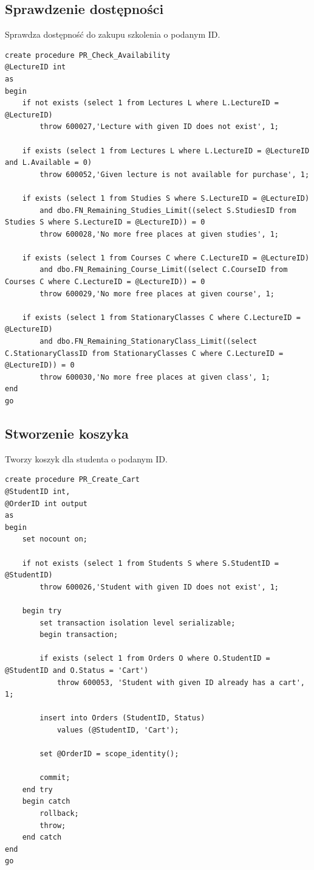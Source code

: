 \documentclass[11pt,a4paper]{article}
\begin{document}
\subsection{Sprawdzenie dostępności}
Sprawdza dostępność do zakupu szkolenia o podanym ID.
\begin{Verbatim}[breaklines=true]
create procedure PR_Check_Availability
@LectureID int
as
begin
    if not exists (select 1 from Lectures L where L.LectureID = @LectureID)
        throw 600027,'Lecture with given ID does not exist', 1;

    if exists (select 1 from Lectures L where L.LectureID = @LectureID and L.Available = 0)
        throw 600052,'Given lecture is not available for purchase', 1;

    if exists (select 1 from Studies S where S.LectureID = @LectureID) 
        and dbo.FN_Remaining_Studies_Limit((select S.StudiesID from Studies S where S.LectureID = @LectureID)) = 0
        throw 600028,'No more free places at given studies', 1;

    if exists (select 1 from Courses C where C.LectureID = @LectureID) 
        and dbo.FN_Remaining_Course_Limit((select C.CourseID from Courses C where C.LectureID = @LectureID)) = 0
        throw 600029,'No more free places at given course', 1;

    if exists (select 1 from StationaryClasses C where C.LectureID = @LectureID) 
        and dbo.FN_Remaining_StationaryClass_Limit((select C.StationaryClassID from StationaryClasses C where C.LectureID = @LectureID)) = 0
        throw 600030,'No more free places at given class', 1;
end
go
\end{Verbatim}

\subsection{Stworzenie koszyka}
Tworzy koszyk dla studenta o podanym ID.
\begin{Verbatim}[breaklines=true]
create procedure PR_Create_Cart
@StudentID int,
@OrderID int output
as
begin
    set nocount on;

    if not exists (select 1 from Students S where S.StudentID = @StudentID)
        throw 600026,'Student with given ID does not exist', 1;

    begin try
        set transaction isolation level serializable;
        begin transaction;

        if exists (select 1 from Orders O where O.StudentID = @StudentID and O.Status = 'Cart')
            throw 600053, 'Student with given ID already has a cart', 1;

        insert into Orders (StudentID, Status)
            values (@StudentID, 'Cart');

        set @OrderID = scope_identity();

        commit;
    end try
    begin catch
        rollback;
        throw;
    end catch 
end
go
\end{Verbatim}
\end{document}
